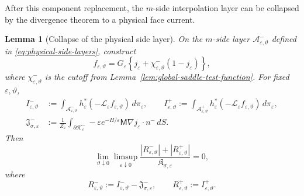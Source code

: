 \documentclass[11pt]{article}
\numberwithin{equation}{section}
\theoremstyle{plain}
\newtheorem{lemma}[theorem]{Lemma}
\theoremstyle{definition}
\theoremstyle{remark}
\newcommand{\eps}{\varepsilon}
\newcommand{\calL}{\mathcal L}
\begin{document}
After this component replacement, the $m$-side interpolation
layer can be collapsed by the divergence theorem to a physical face current.

\begin{lemma}[Collapse of the physical side layer]
\label{lem:collapse-physical-side-layer}
On the $m$-side layer $\mathcal A_{\eps,\vartheta}^-$ defined in
\eqref{eq:physical-side-layers},
construct
\[
f_{\eps,\vartheta}=G_\eps\left\{j_\eps+\chi_{\eps,\vartheta}^-(1-j_\eps)\right\},
\]
where $\chi_{\eps,\vartheta}^-$ is the cutoff from
Lemma~\ref{lem:global-saddle-test-function}.  For fixed $\eps,\vartheta$,
\[
\begin{aligned}
I_{\eps,\vartheta}^-
&:=\int_{\mathcal A_{\eps,\vartheta}^-}
h_\eps^*(-\calL_\eps f_{\eps,\vartheta})\,d\pi_\eps,
\qquad
I_{\eps,\vartheta}^+
:=\int_{\mathcal A_{\eps,\vartheta}^+}
h_\eps^*(-\calL_\eps f_{\eps,\vartheta})\,d\pi_\eps,\\
\mathfrak J_{\sigma,\eps}^-
&:=\frac1{Z_\eps}\int_{\partial\mathcal K_\eps^-}
-\eps e^{-H/\eps}\mathsf M\nabla j_\eps\cdot n^-\,dS.
\end{aligned}
\]
Then
\begin{equation}
\label{eq:side-collapse-ordered-remainder}
\lim_{\vartheta\downarrow0}\limsup_{\eps\downarrow0}
\frac{|R_{\eps,\vartheta}^-|+|R_{\eps,\vartheta}^+|}
{\mathfrak K_{\sigma,\eps}}=0,
\end{equation}
where
\[
R_{\eps,\vartheta}^-:=I_{\eps,\vartheta}^--\mathfrak J_{\sigma,\eps}^-,
\qquad
R_{\eps,\vartheta}^+:=I_{\eps,\vartheta}^+.
\]
\end{lemma}
\end{document}
